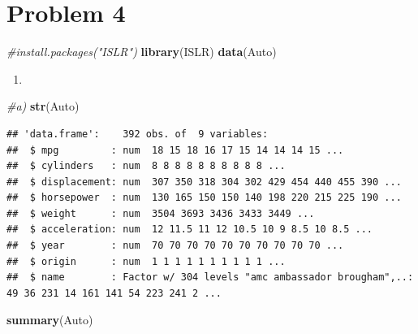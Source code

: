 \documentclass[]{article}
\newenvironment{Shaded}{\begin{snugshade}}{\end{snugshade}}
\newcommand{\KeywordTok}[1]{\textcolor[rgb]{0.13,0.29,0.53}{\textbf{#1}}}
\newcommand{\CommentTok}[1]{\textcolor[rgb]{0.56,0.35,0.01}{\textit{#1}}}
\newcommand{\NormalTok}[1]{#1}
\begin{document}
\section{Problem 4}\label{problem-4}

\begin{Shaded}
\begin{Highlighting}[]
\CommentTok{#install.packages("ISLR")}
\KeywordTok{library}\NormalTok{(ISLR)}
\KeywordTok{data}\NormalTok{(Auto)}
\end{Highlighting}
\end{Shaded}

\begin{enumerate}
\def\labelenumi{\alph{enumi})}
\item
\end{enumerate}

\begin{Shaded}
\begin{Highlighting}[]
\CommentTok{#a)}
\KeywordTok{str}\NormalTok{(Auto)}
\end{Highlighting}
\end{Shaded}

\begin{verbatim}
## 'data.frame':    392 obs. of  9 variables:
##  $ mpg         : num  18 15 18 16 17 15 14 14 14 15 ...
##  $ cylinders   : num  8 8 8 8 8 8 8 8 8 8 ...
##  $ displacement: num  307 350 318 304 302 429 454 440 455 390 ...
##  $ horsepower  : num  130 165 150 150 140 198 220 215 225 190 ...
##  $ weight      : num  3504 3693 3436 3433 3449 ...
##  $ acceleration: num  12 11.5 11 12 10.5 10 9 8.5 10 8.5 ...
##  $ year        : num  70 70 70 70 70 70 70 70 70 70 ...
##  $ origin      : num  1 1 1 1 1 1 1 1 1 1 ...
##  $ name        : Factor w/ 304 levels "amc ambassador brougham",..: 49 36 231 14 161 141 54 223 241 2 ...
\end{verbatim}

\begin{Shaded}
\begin{Highlighting}[]
\KeywordTok{summary}\NormalTok{(Auto)}
\end{Highlighting}
\end{Shaded}
\end{document}
